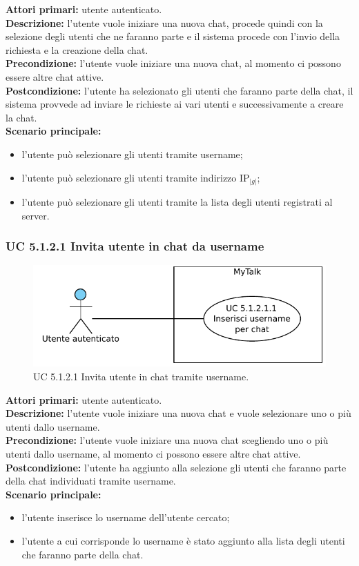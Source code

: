 \noindent
\textbf{Attori primari:} utente autenticato.\\
\textbf{Descrizione:} l'utente vuole iniziare una nuova chat, procede quindi con la selezione degli utenti che ne faranno parte e il sistema procede con l'invio della richiesta e la creazione della chat.\\
\textbf{Precondizione:} l'utente vuole iniziare una nuova chat, al momento ci possono essere altre chat attive.\\ 
\textbf{Postcondizione:} l'utente ha selezionato gli utenti che faranno parte della chat, il sistema provvede ad inviare le richieste ai vari utenti e successivamente a creare la chat.\\
\textbf{Scenario principale:}
\begin{itemize}
\item l'utente può selezionare gli utenti tramite username;
\item l'utente può selezionare gli utenti tramite indirizzo IP$_{|g|}$;
\item l'utente può selezionare gli utenti tramite la lista degli utenti registrati al server.
\end{itemize}

\subsubsection{UC 5.1.2.1 Invita utente in chat da username}

\begin{figure}[htbp]
\centering
\includegraphics[scale=0.7]{./casi_uso/UC5-1-2-1.pdf}
\caption{UC 5.1.2.1 Invita utente in chat tramite username.}
\end{figure}

\noindent
\textbf{Attori primari:} utente autenticato.\\
\textbf{Descrizione:} l'utente vuole iniziare una nuova chat e vuole selezionare uno o più utenti dallo username.\\
\textbf{Precondizione:} l'utente vuole iniziare una nuova chat scegliendo uno o più utenti dallo username, al momento ci possono essere altre chat attive.\\ 
\textbf{Postcondizione:} l'utente ha aggiunto alla selezione gli utenti che faranno parte della chat individuati tramite username.\\
\textbf{Scenario principale:}
\begin{itemize}
\item l'utente inserisce lo username dell'utente cercato;
\item l'utente a cui corrisponde lo username è stato aggiunto alla lista degli utenti che faranno parte della chat.
\end{itemize}

